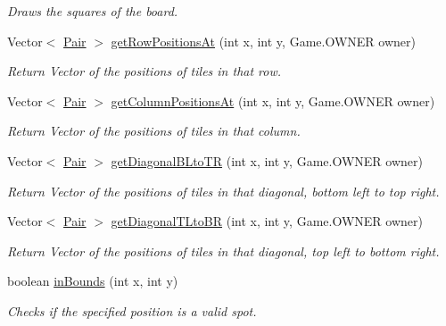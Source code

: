 \begin{DoxyCompactItemize}
\begin{DoxyCompactList}\small\item\em Draws the squares of the board. \end{DoxyCompactList}\item 
Vector$<$ \hyperlink{classapplication_1_1_pair}{Pair} $>$ \hyperlink{classapplication_1_1_map_a0bdc2326a0f637cc37877f480546e8cd}{get\+Row\+Positions\+At} (int x, int y, Game.\+O\+W\+N\+E\+R owner)
\begin{DoxyCompactList}\small\item\em Return Vector of the positions of tiles in that row. \end{DoxyCompactList}\item 
Vector$<$ \hyperlink{classapplication_1_1_pair}{Pair} $>$ \hyperlink{classapplication_1_1_map_a7236d3894ef2460f49341c63ca24d30a}{get\+Column\+Positions\+At} (int x, int y, Game.\+O\+W\+N\+E\+R owner)
\begin{DoxyCompactList}\small\item\em Return Vector of the positions of tiles in that column. \end{DoxyCompactList}\item 
Vector$<$ \hyperlink{classapplication_1_1_pair}{Pair} $>$ \hyperlink{classapplication_1_1_map_a57789d28a30b28e06bc2f34bfc0ea114}{get\+Diagonal\+B\+Lto\+T\+R} (int x, int y, Game.\+O\+W\+N\+E\+R owner)
\begin{DoxyCompactList}\small\item\em Return Vector of the positions of tiles in that diagonal, bottom left to top right. \end{DoxyCompactList}\item 
Vector$<$ \hyperlink{classapplication_1_1_pair}{Pair} $>$ \hyperlink{classapplication_1_1_map_af3f89ab9eda95d77a1ea1f135ec69b0a}{get\+Diagonal\+T\+Lto\+B\+R} (int x, int y, Game.\+O\+W\+N\+E\+R owner)
\begin{DoxyCompactList}\small\item\em Return Vector of the positions of tiles in that diagonal, top left to bottom right. \end{DoxyCompactList}\item 
boolean \hyperlink{classapplication_1_1_map_a2cbd93ac3f3085fff563bd26a45524ba}{in\+Bounds} (int x, int y)
\begin{DoxyCompactList}\small\item\em Checks if the specified position is a valid spot. \end{DoxyCompactList}\item 

\end{DoxyCompactItemize}
